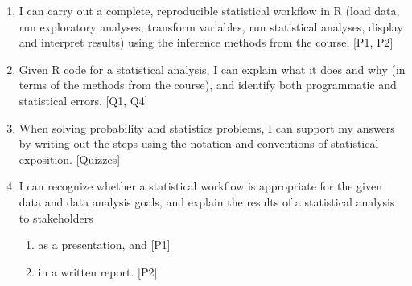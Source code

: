 \documentclass[12pt]{article}
\begin{document}
\begin{enumerate}
    \item I can carry out a complete, reproducible statistical workflow in R (load data, run exploratory analyses, transform variables, run statistical analyses, display and interpret results) using the inference methods from the course. [P1, P2] 
    \item Given R code for a statistical analysis, I can explain what it does and why (in terms of the methods from the course), and identify both programmatic and statistical errors. [Q1, Q4] 
    \item When solving probability and statistics problems, I can support my answers by writing out the steps using the notation and conventions of statistical exposition. [Quizzes] 
    \item I can recognize whether a statistical workflow is appropriate for the given data and data analysis goals, and explain the results of a statistical analysis to stakeholders
    \begin{enumerate}
        \item as a presentation, and [P1] 
        \item in a written report. [P2]
    \end{enumerate}    
\end{enumerate}

\end{document}
